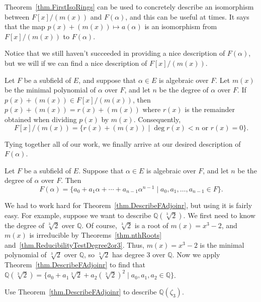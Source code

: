 Theorem~\ref{thm.FirstIsoRings} can be used to concretely describe an isomorphism between $F[x]/(m(x))$ and $F(\alpha)$, and this can be useful at times. It says that the map  $p(x) + (m(x))\mapsto a(\alpha)$ is an isomorphism from $F[x]/(m(x))$ to $F(\alpha)$.

Notice that we still haven't succeeded in providing a nice description of $F(\alpha)$, but we will if we can find a nice description of $F[x]/(m(x))$.

\begin{lemma}\label{lem.DescribeQuotientWithRemainders}
Let $F$ be a subfield of $E$, and suppose that $\alpha\in E$ is algebraic over $F$. Let $m(x)$ be the minimal polynomial of $\alpha$ over $F$, and let $n$ be the degree of $\alpha$ over $F$.  If $p(x) + (m(x)) \in F[x]/(m(x))$, then $p(x) + (m(x)) =  r(x) + (m(x))$ where $r(x)$ is the remainder obtained when dividing $p(x)$ by $m(x)$. Consequently,
\[F[x]/(m(x)) = \{r(x) +  (m(x)) \mid \deg r(x) < n \text{ or } r(x) = 0\}.\]
\end{lemma}

Tying together all of our work, we finally arrive at our desired description of $F(\alpha)$.

\begin{theorem}\label{thm.DescribeFAdjoinr}
Let $F$ be a subfield of $E$. Suppose that $\alpha\in E$ is algebraic over $F$, and let $n$ be the degree of $\alpha$ over $F$. Then \[F(\alpha) = \{a_0 + a_1\alpha+\cdots+a_{n-1}\alpha^{n-1} \mid a_0,a_1,\ldots,a_{n-1} \in F\}.\]
\end{theorem}

We had to work hard for Theorem~\ref{thm.DescribeFAdjoinr}, but using it is fairly easy. For example, suppose we want to describe $\mathbb{Q}(\sqrt[3]{2})$. We first need to know the degree of $\sqrt[3]{2}$ over $\mathbb{Q}$. Of course, $\sqrt[3]{2}$ is a root of $m(x) = x^3-2$, and $m(x)$ is irreducible by Theorems~\ref{thm.nthRoots} and~\ref{thm.ReducibilityTestDegree2or3}. Thus, $m(x) = x^3-2$ is the minimal polynomial of $\sqrt[3]{2}$ over $\mathbb{Q}$, so $\sqrt[3]{2}$ has degree $3$ over $\mathbb{Q}$. Now we  apply Theorem~\ref{thm.DescribeFAdjoinr} to find that $\mathbb{Q}(\sqrt[3]{2}) = \{a_0 + a_1\sqrt[3]{2}+a_{2}(\sqrt[3]{2})^{2} \mid a_0,a_1,a_2 \in \mathbb{Q}\}$.

\begin{problem}
Use  Theorem~\ref{thm.DescribeFAdjoinr} to describe $\mathbb{Q}(\zeta_3)$.
\end{problem}

